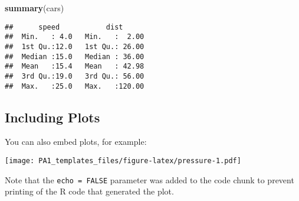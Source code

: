 \documentclass[
]{article}
\newenvironment{Shaded}{\begin{snugshade}}{\end{snugshade}}
\newcommand{\KeywordTok}[1]{\textcolor[rgb]{0.13,0.29,0.53}{\textbf{#1}}}
\newcommand{\NormalTok}[1]{#1}
\begin{document}
\begin{Shaded}
\begin{Highlighting}[]
\KeywordTok{summary}\NormalTok{(cars)}
\end{Highlighting}
\end{Shaded}

\begin{verbatim}
##      speed           dist       
##  Min.   : 4.0   Min.   :  2.00  
##  1st Qu.:12.0   1st Qu.: 26.00  
##  Median :15.0   Median : 36.00  
##  Mean   :15.4   Mean   : 42.98  
##  3rd Qu.:19.0   3rd Qu.: 56.00  
##  Max.   :25.0   Max.   :120.00
\end{verbatim}

\hypertarget{including-plots}{%
\subsection{Including Plots}\label{including-plots}}

You can also embed plots, for example:

\texttt{[image: PA1\_templates\_files/figure-latex/pressure-1.pdf]}

Note that the \texttt{echo\ =\ FALSE} parameter was added to the code
chunk to prevent printing of the R code that generated the plot.
\end{document}
